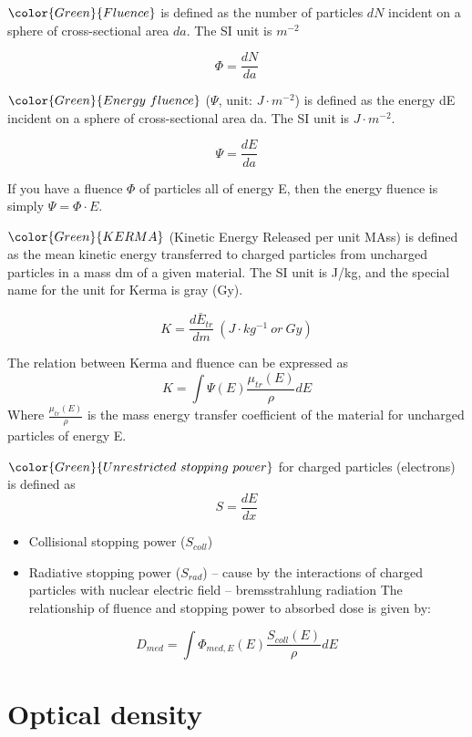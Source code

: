 \documentclass[]{book}
\providecommand{\tightlist}{%
  \setlength{\itemsep}{0pt}\setlength{\parskip}{0pt}}
\theoremstyle{definition}
\theoremstyle{definition}
\theoremstyle{definition}
\theoremstyle{remark}
\begin{document}
\(\color{Green}{Fluence}\) is defined as the number of particles \(dN\)
incident on a sphere of cross-sectional area \(da\). The SI unit is
\(m^{-2}\)

\begin{equation}
    \Phi = \frac{dN}{da}
    \label{eq:fluence}
\end{equation}

\(\color{Green}{Energy\ fluence}\) (\(\Psi\), unit: \(J\cdot m^{-2}\))
is defined as the energy dE incident on a sphere of cross-sectional area
da. The SI unit is \(J\cdot m^{-2}\).

\begin{equation}
    \Psi = \frac{dE}{da}
    \label{eq:efluence}
\end{equation}

If you have a fluence \(\Phi\) of particles all of energy E, then the
energy fluence is simply \(\Psi = \Phi\cdot E\).

\(\color{Green}{KERMA}\) (Kinetic Energy Released per unit MAss) is
defined as the mean kinetic energy transferred to charged particles from
uncharged particles in a mass dm of a given material. The SI unit is
J/kg, and the special name for the unit for Kerma is gray (Gy).

\begin{equation}
    K=\frac{d\bar E_{tr}}{dm} ~ (J\cdot kg^{-1}\ or\ Gy)
    \label{eq:kerma}
\end{equation}

The relation between Kerma and fluence can be expressed as
\[K=\int \Psi(E)\frac{\mu_{tr}(E)}{\rho}dE\] Where
\(\frac{\mu_{tr}(E)}{\rho}\) is the mass energy transfer coefficient of
the material for uncharged particles of energy E.

\(\color{Green}{Unrestricted\ stopping\ power}\) for charged particles
(electrons) is defined as \[ S = \frac{dE}{dx} \]

\begin{itemize}
\tightlist
\item
  Collisional stopping power (\(S_{coll}\))
\item
  Radiative stopping power (\(S_{rad}\)) -- cause by the interactions of
  charged particles with nuclear electric field -- bremsstrahlung
  radiation The relationship of fluence and stopping power to absorbed
  dose is given by:
\end{itemize}

\[D_{med}=\int \Phi_{med, E}(E)\frac{S_{coll}(E)}{\rho}dE\]

\section{Optical density}\label{optical-density}
\end{document}
